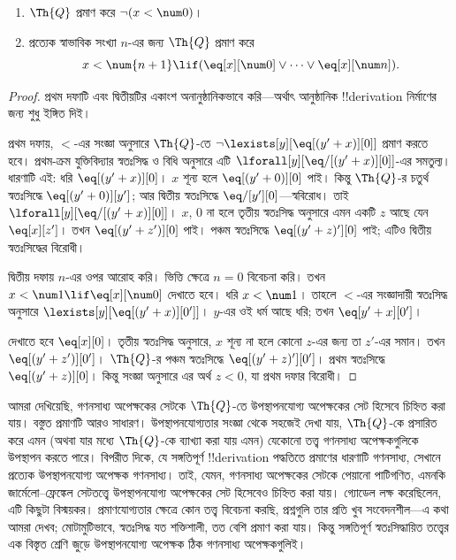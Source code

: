 \documentclass[../../../include/open-logic-section]{subfiles}
\begin{document}
\begin{lem}
\begin{enumerate}
\item $\Th{Q}$ প্রমাণ করে $\lnot (x < \num 0)$।
\item প্রত্যেক স্বাভাবিক সংখ্যা $n$-এর জন্য $\Th{Q}$ প্রমাণ করে
\[
x < \num {n+1} \lif (\eq[x][\num 0] \lor \dots \lor \eq[x][\num n]).
\]
\end{enumerate}
\end{lem}

\begin{proof}
প্রথম দফাটি এবং দ্বিতীয়টির একাংশ অনানুষ্ঠানিকভাবে করি—অর্থাৎ আনুষ্ঠানিক
!!{derivation} নির্মাণের জন্য শুধু ইঙ্গিত দিই।

প্রথম দফায়, $<$-এর সংজ্ঞা অনুসারে $\Th{Q}$-তে $\lnot
\lexists[y][\eq[(y'+x)][0]]$ প্রমাণ করতে হবে। প্রথম-ক্রম যুক্তিবিদ্যার
স্বতঃসিদ্ধ ও বিধি অনুসারে এটি $\lforall[y][\eq/[(y' +
    x)][0]]$-এর সমতুল্য। ধারণাটি এই: ধরি $\eq[(y'+x)][0]$। $x$ শূন্য
হলে $\eq[(y' + 0)][0]$ পাই। কিন্তু $\Th{Q}$-র চতুর্থ স্বতঃসিদ্ধে
$\eq[(y' + 0)][y']$; আর দ্বিতীয় স্বতঃসিদ্ধে $\eq/[y'][0]$—স্ববিরোধ।
তাই $\lforall[y][\eq/[(y' +x)][0]]$। $x$, $0$ না হলে তৃতীয়
স্বতঃসিদ্ধ অনুসারে এমন একটি $z$ আছে যেন $\eq[x][z']$। তখন
$\eq[(y' + z')][0]$ পাই। পঞ্চম স্বতঃসিদ্ধে $\eq[(y' + z)'][0]$ পাই;
এটিও দ্বিতীয় স্বতঃসিদ্ধের বিরোধী।

দ্বিতীয় দফায় $n$-এর ওপর আরোহ করি। ভিত্তি ক্ষেত্রে $n =0$ বিবেচনা
করি। তখন $x < \num 1 \lif \eq[x][\num
  0]$ দেখাতে হবে। ধরি $x < \num 1$। তাহলে $<$-এর সংজ্ঞাদায়ী
স্বতঃসিদ্ধ অনুসারে $\lexists[y][\eq[(y'+x)][0']]$। $y$-এর ওই ধর্ম
আছে ধরি; তখন $\eq[y'+x][0']$।

দেখাতে হবে $\eq[x][0]$। তৃতীয় স্বতঃসিদ্ধ অনুসারে, $x$ শূন্য না হলে
কোনো $z$-এর জন্য তা $z'$-এর সমান। তখন $\eq[(y' + z')][0']$। $\Th{Q}$-র পঞ্চম
স্বতঃসিদ্ধে $\eq[(y'+z)'][0']$। প্রথম স্বতঃসিদ্ধে $\eq[(y' +
    z)][0]$। কিন্তু সংজ্ঞা অনুসারে এর অর্থ $z < 0$, যা প্রথম দফার
বিরোধী।
\end{proof}

\begin{explain}
আমরা দেখিয়েছি, গণনসাধ্য অপেক্ষকের সেটকে $\Th{Q}$-তে উপস্থাপনযোগ্য
অপেক্ষকের সেট হিসেবে চিহ্নিত করা যায়। বস্তুত প্রমাণটি আরও সাধারণ।
উপস্থাপনযোগ্যতার সংজ্ঞা থেকে সহজেই দেখা যায়, $\Th{Q}$-কে প্রসারিত করে
এমন (অথবা যার মধ্যে $\Th{Q}$-কে ব্যাখ্যা করা যায় এমন) যেকোনো
তত্ত্ব গণনসাধ্য অপেক্ষকগুলিকে উপস্থাপন করতে পারে। বিপরীত দিকে, যে
সঙ্গতিপূর্ণ !!{derivation} পদ্ধতিতে প্রমাণের ধারণাটি গণনসাধ্য, সেখানে
প্রত্যেক উপস্থাপনযোগ্য অপেক্ষক গণনসাধ্য। তাই, যেমন, গণনসাধ্য অপেক্ষকের
সেটকে পেয়ানো পাটিগণিত, এমনকি জার্মেলো--ফ্রেঙ্কেল সেটতত্ত্বে
উপস্থাপনযোগ্য অপেক্ষকের সেট হিসেবেও চিহ্নিত করা যায়। গ্যোডেল লক্ষ
করেছিলেন, এটি কিছুটা বিস্ময়কর। প্রমাণযোগ্যতার ক্ষেত্রে কোন তত্ত্ব
বিবেচনা করছি, প্রশ্নগুলি তার প্রতি খুব সংবেদনশীল—এ কথা আমরা দেখব;
মোটামুটিভাবে, স্বতঃসিদ্ধ যত শক্তিশালী, তত বেশি প্রমাণ করা যায়। কিন্তু
সঙ্গতিপূর্ণ স্বতঃসিদ্ধায়িত তত্ত্বের এক বিস্তৃত শ্রেণি জুড়ে উপস্থাপনযোগ্য
অপেক্ষক ঠিক গণনসাধ্য অপেক্ষকগুলিই।
\end{explain}
\end{document}
